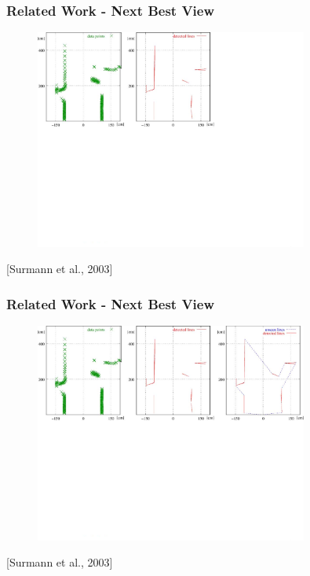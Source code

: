 \documentclass[t]{beamer} %
\begin{document}
\begin{frame}
	\frametitle{ Related Work - Next Best View}
	\begin{figure}[h]
		\includegraphics[width=0.8\textwidth]{src/nbv2.png}
	\end{figure}
	\centering
	\scriptsize [Surmann et al., 2003]
\end{frame}

\begin{frame}
	\frametitle{ Related Work - Next Best View}
	\begin{figure}[h]
		\includegraphics[width=0.8\textwidth]{src/nbv3.png}
	\end{figure}
	\centering
	\scriptsize [Surmann et al., 2003]
\end{frame}
\end{document}
